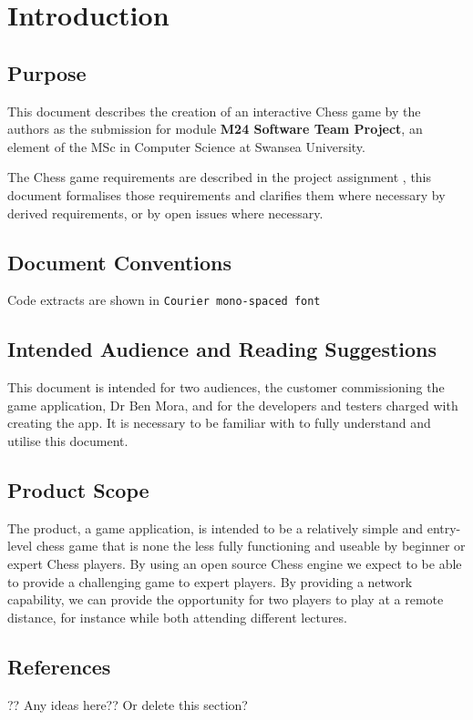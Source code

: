 \documentclass[a4paper,10pt]{article}
\begin{document}
\section{Introduction}
\subsection{Purpose}

This document describes the creation of an interactive Chess game by the authors as the submission for module \textbf{M24 Software Team Project}, an element of the MSc in Computer Science at Swansea University.

The Chess game requirements are described in the project assignment \cite{Assignment2Spec}, this document formalises those requirements and clarifies them where necessary by derived requirements, or by open issues where necessary. 

\subsection{Document Conventions}

Code extracts are shown in \texttt{Courier mono-spaced font}


\subsection{Intended Audience and Reading Suggestions}

This document is intended for two audiences, the customer commissioning the game application, Dr Ben Mora, and for the developers and testers charged with creating the app. It is necessary to be familiar with \cite{Assignment2Spec} to fully understand and utilise this document. 

\subsection{Product Scope}

The product, a game application, is intended to be a relatively simple and entry-level chess game that is none the less fully functioning and useable by beginner or expert Chess players. By using an open source Chess engine we expect to be able to provide a challenging game to expert players. By providing a network capability, we can provide the opportunity for two players to play at a remote distance, for instance while both attending different lectures. 

\subsection{References}
?? Any ideas here?? Or delete this section?
\end{document}
